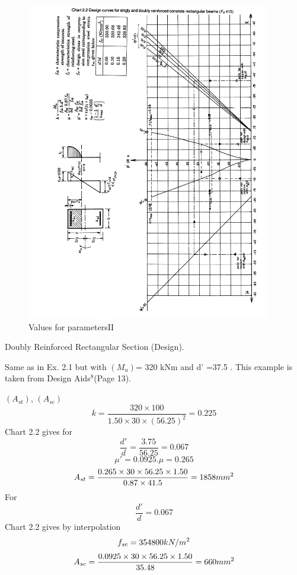 \begin{figure}
\centering
\includegraphics[width=0.95\textwidth]{images/ch2-6.png}
\caption{Values for parametersII}
\label{Values for parametersII}
\end{figure}
\newpage
\begin{example} Doubly Reinforced Rectangular Section (Design).

\given Same as in Ex. 2.1 but with $(M_{u})$= 320 kNm and d’ =37.5 \mm. This example is taken
from Design Aids$^{8}$(Page 13).

\required $(A_{st})$, $(A_{sc})$
\solution
$$k=\frac{320 \times 100}{1.50 \times 30 \times (56.25)^2}=0.225$$
Chart 2.2 gives for
$$\frac{d'}{d}=\frac{3.75}{56.25}=0.067$$ 
$$\mu'=0.0925.\mu=0.265$$
$$A_{st}=\frac{0.265 \times 30\times 56.25 \times 1.50}{0.87 \times 41.5}=1858 mm^2$$
For
$$\frac{d'}{d}=0.067$$
Chart 2.2 gives by interpolation
$$f_{sc}=354800kN/m^2$$
$$A_{sc}=\frac{0.0925 \times 30 \times 56.25 \times 1.50}{35.48}=660mm^2$$
\end{example}


